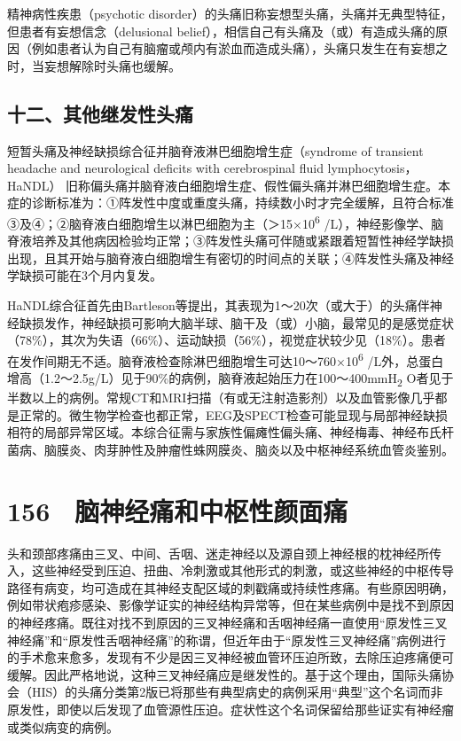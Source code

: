 精神病性疾患（psychotic
disorder）的头痛旧称妄想型头痛，头痛并无典型特征，但患者有妄想信念（delusional
belief），相信自己有头痛及（或）有造成头痛的原因（例如患者认为自己有脑瘤或颅内有淤血而造成头痛），头痛只发生在有妄想之时，当妄想解除时头痛也缓解。

\subsection{十二、其他继发性头痛}

短暂头痛及神经缺损综合征并脑脊液淋巴细胞增生症（syndrome of transient
headache and neurological deficits with cerebrospinal fluid
lymphocytosis，HaNDL）
旧称偏头痛并脑脊液白细胞增生症、假性偏头痛并淋巴细胞增生症。本症的诊断标准为：①阵发性中度或重度头痛，持续数小时才完全缓解，且符合标准③及④；②脑脊液白细胞增生以淋巴细胞为主（＞15×10\textsuperscript{6}
/L），神经影像学、脑脊液培养及其他病因检验均正常；③阵发性头痛可伴随或紧跟着短暂性神经学缺损出现，且其开始与脑脊液白细胞增生有密切的时间点的关联；④阵发性头痛及神经学缺损可能在3个月内复发。

HaNDL综合征首先由Bartleson等提出，其表现为1～20次（或大于）的头痛伴神经缺损发作，神经缺损可影响大脑半球、脑干及（或）小脑，最常见的是感觉症状（78\%），其次为失语（66\%）、运动缺损（56\%），视觉症状较少见（18\%）。患者在发作间期无不适。脑脊液检查除淋巴细胞增生可达10～760×10\textsuperscript{6}
/L外，总蛋白增高（1.2～2.5g/L）见于90\%的病例，脑脊液起始压力在100～400mmH\textsubscript{2}
O者见于半数以上的病例。常规CT和MRI扫描（有或无注射造影剂）以及血管影像几乎都是正常的。微生物学检查也都正常，EEG及SPECT检查可能显现与局部神经缺损相符的局部异常区域。本综合征需与家族性偏瘫性偏头痛、神经梅毒、神经布氏杆菌病、脑膜炎、肉芽肿性及肿瘤性蛛网膜炎、脑炎以及中枢神经系统血管炎鉴别。

\protect\hypertarget{text00353.html}{}{}

\section{156　脑神经痛和中枢性颜面痛}

头和颈部疼痛由三叉、中间、舌咽、迷走神经以及源自颈上神经根的枕神经所传入，这些神经受到压迫、扭曲、冷刺激或其他形式的刺激，或这些神经的中枢传导路径有病变，均可造成在其神经支配区域的刺戳痛或持续性疼痛。有些原因明确，例如带状疱疹感染、影像学证实的神经结构异常等，但在某些病例中是找不到原因的神经疼痛。既往对找不到原因的三叉神经痛和舌咽神经痛一直使用“原发性三叉神经痛”和“原发性舌咽神经痛”的称谓，但近年由于“原发性三叉神经痛”病例进行的手术愈来愈多，发现有不少是因三叉神经被血管环压迫所致，去除压迫疼痛便可缓解。因此严格地说，这种三叉神经痛应是继发性的。基于这个理由，国际头痛协会（HIS）的头痛分类第2版已将那些有典型病史的病例采用“典型”这个名词而非原发性，即使以后发现了血管源性压迫。症状性这个名词保留给那些证实有神经瘤或类似病变的病例。

